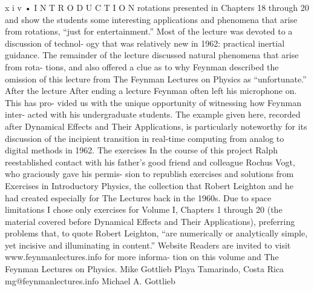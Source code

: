 \documentclass[10pt,oneside]{article}
\begin{document}
x i v • I N T R O D U C T I O N rotations presented in Chapters 18 through 20 and show the students some interesting applications and phenomena that arise from rotations, “just for entertainment.” Most of the lecture was devoted to a discussion of technol- ogy that was relatively new in 1962: practical inertial guidance. The remainder of the lecture discussed natural phenomena that arise from rota- tions, and also offered a clue as to why Feynman described the omission of this lecture from The Feynman Lectures on Physics as “unfortunate.” After the lecture After ending a lecture Feynman often left his microphone on. This has pro- vided us with the unique opportunity of witnessing how Feynman inter- acted with his undergraduate students. The example given here, recorded after Dynamical Effects and Their Applications, is particularly noteworthy for its discussion of the incipient transition in real-time computing from analog to digital methods in 1962. The exercises In the course of this project Ralph reestablished contact with his father’s good friend and colleague Rochus Vogt, who graciously gave his permis- sion to republish exercises and solutions from Exercises in Introductory Physics, the collection that Robert Leighton and he had created especially for The Lectures back in the 1960s. Due to space limitations I chose only exercises for Volume I, Chapters 1 through 20 (the material covered before Dynamical Effects and Their Applications), preferring problems that, to quote Robert Leighton, “are numerically or analytically simple, yet incisive and illuminating in content.” Website Readers are invited to visit www.feynmanlectures.info for more informa- tion on this volume and The Feynman Lectures on Physics. Mike Gottlieb Playa Tamarindo, Costa Rica mg@feynmanlectures.info Michael A. Gottlieb\par

\clearpage
{}
\end{document}

